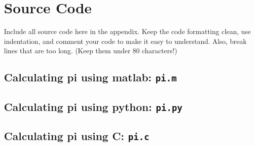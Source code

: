 \newpage

\appendix

\section{Source Code}

Include all source code here in the appendix. Keep the code formatting clean,
use indentation, and comment your code to make it easy to understand. Also,
break lines that are too long. (Keep them under 80 characters!)

\subsection{Calculating pi using matlab: \texttt{pi.m}}


\subsection{Calculating pi using python: \texttt{pi.py}}


\subsection{Calculating pi using C: \texttt{pi.c}}



